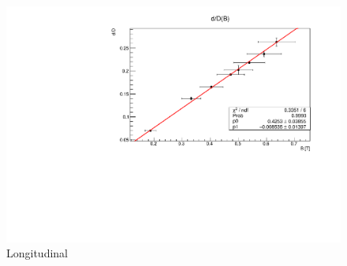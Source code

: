 \documentclass[a4paper,12pt,abstracton]{scrartcl}
\begin{document}
\begin{figure}[H]
    \centering
    \includegraphics[scale=0.85]{plots/znl.pdf}
    \caption{Longitudinal}
    \label{fig:znl}
\end{figure}
        
\clearpage
\end{document}
